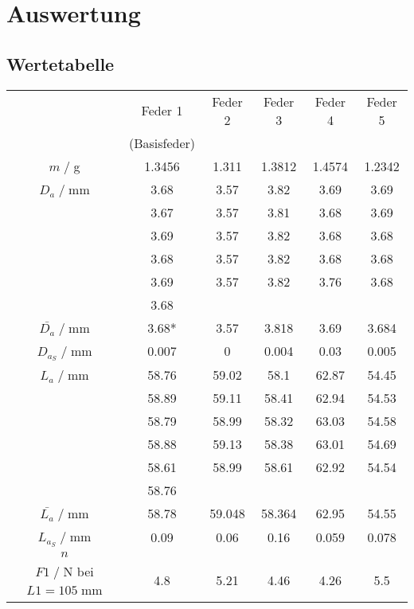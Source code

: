 \newpage
\section{Auswertung}
\subsection{Wertetabelle}
\begin{table}[H]
    \centering
    \begin{tabular}{c | c c c c c}
        \toprule
        & Feder 1 & Feder 2 & Feder 3 & Feder 4 & Feder 5 \\ & (Basisfeder)\\
        \midrule
        $m\;/\;$g & 1.3456 & 1.311 & 1.3812 & 1.4574 & 1.2342 \\
        \midrule
        $D_a\;/\;$mm & 3.68 & 3.57 & 3.82 & 3.69 & 3.69 \\
          & 3.67 & 3.57 & 3.81 & 3.68 & 3.69 \\
          & 3.69 & 3.57 & 3.82 & 3.68 & 3.68 \\
          & 3.68 & 3.57 & 3.82 & 3.68 & 3.68 \\
          & 3.69 & 3.57 & 3.82 & 3.76 & 3.68 \\
          & 3.68 &         &         &         &         \\
        \midrule
        $\bar{D_a}\;/\;$mm & 3.68* & 3.57 & 3.818 & 3.69 & 3.684\\
        $D_{a_S}\;/\;$mm& 0.007 & 0 & 0.004 & 0.03 & 0.005\\
        \midrule
        $L_a\;/\;$mm & 58.76 & 59.02 & 58.1 & 62.87 & 54.45 \\
          & 58.89 & 59.11 & 58.41 & 62.94 & 54.53 \\
          & 58.79 & 58.99 & 58.32 & 63.03 & 54.58 \\
          & 58.88 & 59.13 & 58.38 & 63.01 & 54.69 \\
          & 58.61 & 58.99 & 58.61 & 62.92 & 54.54 \\
          & 58.76 &         &         &         &         \\
        \midrule
        $\bar{L_a}\;/\;$mm & 58.78 & 59.048 & 58.364 & 62.95 & 54.55\\
        $L_{a_S}\;/\;$mm & 0.09 & 0.06 & 0.16 & 0.059 & 0.078\\
        $n$ & & & & & \\
        \midrule
        $F1\;/\;$N bei $L1=105\;$mm & 4.8 & 5.21 & 4.46 & 4.26 & 5.5\\

\end{tabular}
\end{table}
